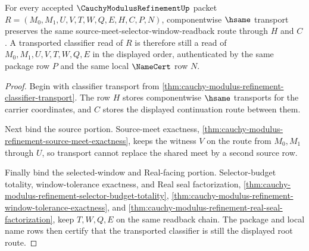 \begin{theorem}
\label{thm:cauchy-modulus-refinement-root-classifier-transport-exactness}
For every accepted $\CauchyModulusRefinementUp$ packet $R=(M_0,M_1,U,V,T,W,Q,E,H,C,P,N)$, componentwise $\hsame$ transport preserves the same source-meet-selector-window-readback route through $H$ and $C$. A transported classifier read of $R$ is therefore still a read of $M_0,M_1,U,V,T,W,Q,E$ in the displayed order, authenticated by the same package row $P$ and the same local $\NameCert$ row $N$.
\end{theorem}
\begin{proof}
Begin with classifier transport from \autoref{thm:cauchy-modulus-refinement-classifier-transport}. The row $H$ stores componentwise $\hsame$ transports for the carrier coordinates, and $C$ stores the displayed continuation route between them.

Next bind the source portion. Source-meet exactness, \autoref{thm:cauchy-modulus-refinement-source-meet-exactness}, keeps the witness $V$ on the route from $M_0,M_1$ through $U$, so transport cannot replace the shared meet by a second source row.

Finally bind the selected-window and Real-facing portion. Selector-budget totality, window-tolerance exactness, and Real seal factorization, \autoref{thm:cauchy-modulus-refinement-selector-budget-totality}, \autoref{thm:cauchy-modulus-refinement-window-tolerance-exactness}, and \autoref{thm:cauchy-modulus-refinement-real-seal-factorization}, keep $T,W,Q,E$ on the same readback chain. The package and local name rows then certify that the transported classifier is still the displayed root route.
\end{proof}

